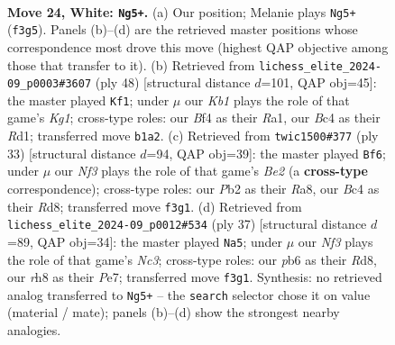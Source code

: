 \documentclass[11pt]{article}
\begin{document}
\clearpage

\begin{figure}[p]\centering
\begin{subfigure}{0.46\textwidth}\centering
\resizebox{\linewidth}{!}{%
\newchessgame
\chessboard[
  setfen={r1b4r/5k2/ppn1p1p1/b3Pp1p/n1B2B2/PN3NP1/1P3P1P/RK1R4 w - - 1 24},
  showmover=false,
  pgfstyle=straightmove, color=movearrow, markmove={f3-g5}
]}
\caption{}
\end{subfigure}\hfill
\begin{subfigure}{0.46\textwidth}\centering
\resizebox{\linewidth}{!}{%
\newchessgame
\chessboard[
  setfen={1r6/1ppr1kp1/p1nbp2p/P3p3/4P3/2P1BN1P/1P3PP1/R2R2K1 w - - 2 25},
  showmover=false,
  pgfstyle=straightmove, color=movearrow, markmove={g1-f1}
]}
\caption{}
\end{subfigure}
\\[4pt]
\begin{subfigure}{0.46\textwidth}\centering
\resizebox{\linewidth}{!}{%
\newchessgame
\chessboard[
  setfen={r2r2k1/ppn1bppp/2p1p1b1/4N3/2PP2P1/4PB2/PP5P/R1BR2K1 b - - 0 17},
  showmover=false,
  pgfstyle=straightmove, color=movearrow, markmove={e7-f6}
]}
\caption{}
\end{subfigure}\hfill
\begin{subfigure}{0.46\textwidth}\centering
\resizebox{\linewidth}{!}{%
\newchessgame
\chessboard[
  setfen={2rr2k1/p3pp2/1pn3pb/2p1P2p/5Pb1/2P2NP1/PP4BP/R1B1R2K b - - 3 19},
  showmover=false,
  pgfstyle=straightmove, color=movearrow, markmove={c6-a5}
]}
\caption{}
\end{subfigure}
\caption{\textbf{Move 24, White: \texttt{Ng5+}.} (a) Our position; Melanie plays \texttt{Ng5+} (\texttt{f3g5}). Panels (b)--(d) are the retrieved master positions whose correspondence most drove this move (highest QAP objective among those that transfer to it). (b) Retrieved from \texttt{lichess\_elite\_2024-09\_p0003\#3607} (ply 48) [structural distance $d$=101, QAP obj=45]: the master played \texttt{Kf1}; under $\mu$ our \emph{Kb1} plays the role of that game's \emph{Kg1}; cross-type roles: our \emph{B}f4 as their \emph{R}a1, our \emph{B}c4 as their \emph{R}d1; transferred move \texttt{b1a2}. (c) Retrieved from \texttt{twic1500\#377} (ply 33) [structural distance $d$=94, QAP obj=39]: the master played \texttt{Bf6}; under $\mu$ our \emph{Nf3} plays the role of that game's \emph{Be2} (a \textbf{cross-type} correspondence); cross-type roles: our \emph{P}b2 as their \emph{R}a8, our \emph{B}c4 as their \emph{R}d8; transferred move \texttt{f3g1}. (d) Retrieved from \texttt{lichess\_elite\_2024-09\_p0012\#534} (ply 37) [structural distance $d$=89, QAP obj=34]: the master played \texttt{Na5}; under $\mu$ our \emph{Nf3} plays the role of that game's \emph{Nc3}; cross-type roles: our \emph{p}b6 as their \emph{R}d8, our \emph{r}h8 as their \emph{P}e7; transferred move \texttt{f3g1}. Synthesis: no retrieved analog transferred to \texttt{Ng5+} -- the \texttt{search} selector chose it on value (material / mate); panels (b)--(d) show the strongest nearby analogies.}
\label{fig:thought-m46}
\end{figure}
\end{document}
